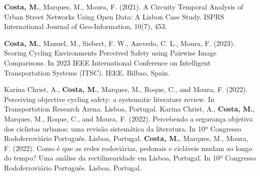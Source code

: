 
\begin{cvpublications}
  \cvpublication
    {\textbf{Costa, M.}, Marques, M., Moura, F. (2021). A Circuity Temporal Analysis of Urban Street Networks Using Open Data: A Lisbon Case Study. ISPRS International Journal of Geo-Information, 10(7), 453.}

\end{cvpublications}




\begin{cvpublications}
\cvpublication
	{\textbf{Costa, M.}, Manuel, M., Siebert, F. W., Azevedo, C. L., Moura, F. (2023). Scoring Cycling Environments Perceived Safety using Pairwise Image Comparisons. In 2023 IEEE International Conference on Intelligent Transportation Systems (ITSC). IEEE. Bilbao, Spain.}
\end{cvpublications}


\begin{cvpublications}

\cvpublication
	{Karina Christ, A., \textbf{Costa, M.}, Marques, M., Roque, C., and Moura, F. (2022). Perceiving objective cycling safety: a systematic literature review. In Transportation Research Arena. Lisboa, Portugal.}
  \cvpublication
    {Karina Christ, A., \textbf{Costa, M.}, Marques, M., Roque, C., and Moura, F. (2022). Percebendo a segurança objetiva dos ciclistas urbanos: uma revisão sistemática da literatura. In 10º Congresso Rodoferroviário Português. Lisboa, Portugal.}
  \cvpublication
    {\textbf{Costa, M.}, Marques, M., Moura, F. (2022). Como é que as redes rodoviárias, pedonais e cicláveis mudam ao longo do tempo? Uma análise da rectilinearidade em Lisboa, Portugal. In 10º Congresso Rodoferroviário Português. Lisboa, Portugal.}

\end{cvpublications}

